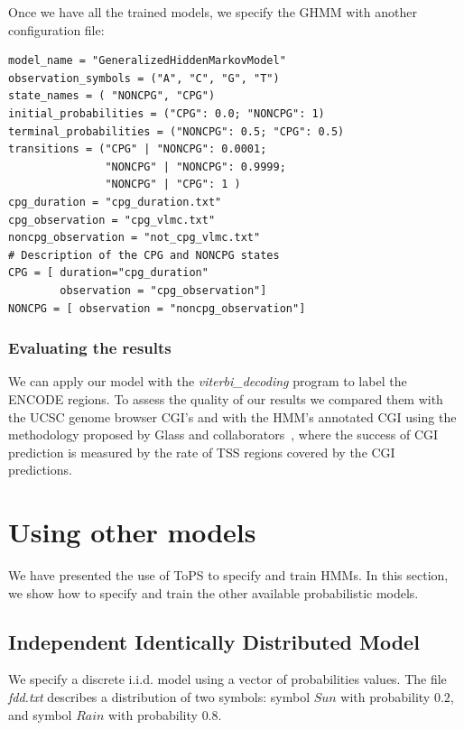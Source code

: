 \documentclass[10pt]{article}
\begin{document}
Once we have all the trained models, we specify the GHMM with another configuration file:
\vspace{1em}
\begin{Verbatim}[frame=single, label=cpg\_island\_ghmm.txt]
model_name = "GeneralizedHiddenMarkovModel"
observation_symbols = ("A", "C", "G", "T")
state_names = ( "NONCPG", "CPG") 
initial_probabilities = ("CPG": 0.0; "NONCPG": 1) 
terminal_probabilities = ("NONCPG": 0.5; "CPG": 0.5)
transitions = ("CPG" | "NONCPG": 0.0001;
               "NONCPG" | "NONCPG": 0.9999;
               "NONCPG" | "CPG": 1 )
cpg_duration = "cpg_duration.txt"
cpg_observation = "cpg_vlmc.txt"
noncpg_observation = "not_cpg_vlmc.txt" 
# Description of the CPG and NONCPG states
CPG = [ duration="cpg_duration"
        observation = "cpg_observation"]    
NONCPG = [ observation = "noncpg_observation"]
\end{Verbatim}
\vspace{1em}

 
\subsubsection*{Evaluating the results}

We can apply our model with the \textit{viterbi\_decoding} program to label  the ENCODE regions.
To assess the quality of our  results we compared them with the UCSC genome browser CGI's and with the HMM's annotated CGI using the methodology proposed by  Glass and collaborators~\cite{Glass2007}, where the success of CGI prediction is measured by the rate of TSS regions covered by the CGI predictions. 


\section*{Using other models}

We have presented the use of ToPS to specify and train HMMs. In this section,  we show how to specify and train the other available probabilistic models.

\subsection*{Independent Identically Distributed Model}

We specify a discrete i.i.d. model using a vector of probabilities values. The file \textit{fdd.txt} describes a distribution of two symbols: symbol $Sun$ with probability $0.2$, and symbol $Rain$ with probability $0.8$.
\end{document}
